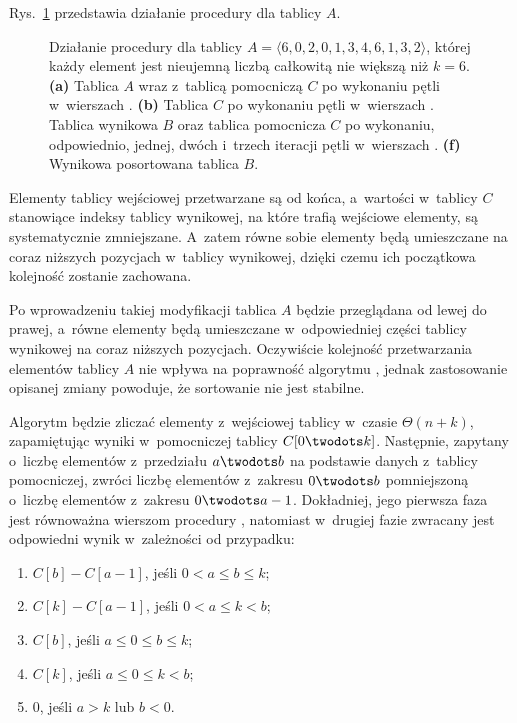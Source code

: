 
\exercise %
Rys.\ \ref{fig:8.2-1} przedstawia działanie procedury  dla tablicy $A$.
\begin{figure}[!ht]
	\centering 
	\caption{Działanie procedury  dla tablicy $A=\langle6,0,2,0,1,3,4,6,1,3,2\rangle$, której każdy element jest nieujemną liczbą całkowitą nie większą niż $k=6$.
{\sffamily\bfseries(a)} Tablica $A$ wraz z~tablicą pomocniczą $C$ po wykonaniu pętli w~wierszach .
{\sffamily\bfseries(b)} Tablica $C$ po wykonaniu pętli w~wierszach .
{\sffamily\bfseries{}} Tablica wynikowa $B$ oraz tablica pomocnicza $C$ po wykonaniu, odpowiednio, jednej, dwóch i~trzech iteracji pętli  w~wierszach .
{\sffamily\bfseries(f)} Wynikowa posortowana tablica $B$.} \label{fig:8.2-1}
\end{figure}

\exercise %
Elementy tablicy wejściowej przetwarzane są od końca, a~wartości w~tablicy $C$ stanowiące indeksy tablicy wynikowej, na które trafią wejściowe elementy, są systematycznie zmniejszane.
A~zatem równe sobie elementy będą umieszczane na coraz niższych pozycjach w~tablicy wynikowej, dzięki czemu ich początkowa kolejność zostanie zachowana.

\exercise %
Po wprowadzeniu takiej modyfikacji tablica $A$ będzie przeglądana od lewej do prawej, a~równe elementy będą umieszczane w~odpowiedniej części tablicy wynikowej na coraz niższych pozycjach.
Oczywiście kolejność przetwarzania elementów tablicy $A$ nie wpływa na poprawność algorytmu , jednak zastosowanie opisanej zmiany powoduje, że sortowanie nie jest stabilne.

\exercise %
Algorytm będzie zliczać elementy z~wejściowej tablicy w~czasie $\Theta(n+k)$, zapamiętując wyniki w~pomocniczej tablicy $C[0\twodots k]$.
Następnie, zapytany o~liczbę elementów z~przedziału $a\twodots b$ na podstawie danych z~tablicy pomocniczej, zwróci liczbę elementów z~zakresu $0\twodots b$ pomniejszoną o~liczbę elementów z~zakresu $0\twodots a-1$.
Dokładniej, jego pierwsza faza jest równoważna wierszom  procedury , natomiast w~drugiej fazie zwracany jest odpowiedni wynik w~zależności od przypadku:
\begin{enumerate}
	\renewcommand{\labelenumi}{(\roman{enumi})}
	\item $C[b]-C[a-1]$, jeśli $0<a\le b\le k$;
	\item $C[k]-C[a-1]$, jeśli $0<a\le k<b$;
	\item $C[b]$, jeśli $a\le0\le b\le k$;
	\item $C[k]$, jeśli $a\le0\le k<b$;
	\item 0, jeśli $a>k$ lub $b<0$.
\end{enumerate}
